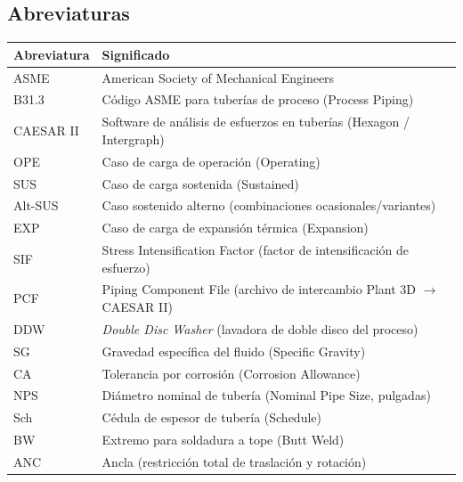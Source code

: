 \vspace{1cm}

\subsection*{Abreviaturas}

\noindent\begin{tabularx}{\textwidth}{@{}l>{\raggedright\arraybackslash}X@{}}
	\toprule
	\textbf{Abreviatura} & \textbf{Significado} \\
	\midrule
	ASME & American Society of Mechanical Engineers \\
	B31.3 & C\'{o}digo ASME para tuber\'{i}as de proceso (Process Piping) \\
	CAESAR II & Software de an\'{a}lisis de esfuerzos en tuber\'{i}as (Hexagon / Intergraph) \\
	OPE & Caso de carga de operaci\'{o}n (Operating) \\
	SUS & Caso de carga sostenida (Sustained) \\
	Alt-SUS & Caso sostenido alterno (combinaciones ocasionales/variantes) \\
	EXP & Caso de carga de expansi\'{o}n t\'{e}rmica (Expansion) \\
	SIF & Stress Intensification Factor (factor de intensificaci\'{o}n de esfuerzo) \\
	PCF & Piping Component File (archivo de intercambio Plant 3D $\rightarrow$ CAESAR II) \\
	DDW & \textit{Double Disc Washer} (lavadora de doble disco del proceso) \\
	SG & Gravedad espec\'{i}fica del fluido (Specific Gravity) \\
	CA & Tolerancia por corrosi\'{o}n (Corrosion Allowance) \\
	NPS & Di\'{a}metro nominal de tuber\'{i}a (Nominal Pipe Size, pulgadas) \\
	Sch & C\'{e}dula de espesor de tuber\'{i}a (Schedule) \\
	BW & Extremo para soldadura a tope (Butt Weld) \\
	ANC & Ancla (restricci\'{o}n total de traslaci\'{o}n y rotaci\'{o}n) \\
	\bottomrule
\end{tabularx}

\newpage
